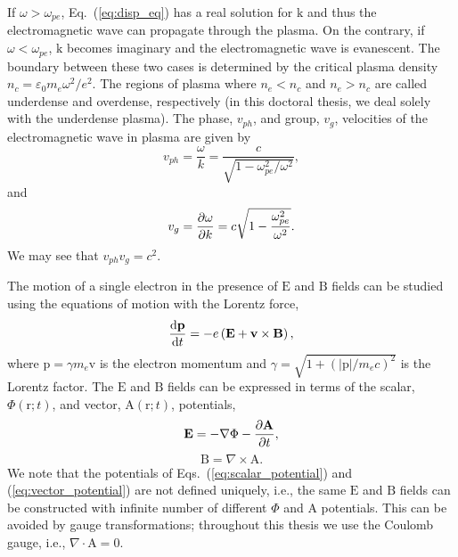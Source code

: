 \documentclass[10pt, a4paper, twoside, openright]{report}
\newcommand{\norm}[1]{|#1|}
\renewcommand{\vec}[1]{\boldsymbol{\mathrm{#1}}}
\newcommand{\rot}[1]{\nabla \times #1}
\newcommand{\grad}[1]{\nabla #1}
\renewcommand{\div}[1]{\nabla \cdot #1}
\begin{document}
If $ \omega > \omega_{pe} $, Eq.~(\ref{eq:disp_eq}) has a real solution for $ \vec{k} $ and thus the electromagnetic wave can propagate through the plasma. On the contrary, if $ \omega < \omega_{pe} $, $ \vec{k} $ becomes imaginary and the electromagnetic wave is evanescent. The boundary between these two cases is determined by the critical plasma density $ n_c = \varepsilon_0 m_e \omega^2 / e^2 $. The regions of plasma where $ n_e < n_c $ and $ n_e > n_c $ are called underdense and overdense, respectively (in this doctoral thesis, we deal solely with the underdense plasma). The phase, $ v_{ph} $, and group, $ v_g $, velocities of the electromagnetic wave in plasma are given by
\begin{equation}\label{eq:phase_velocity}
	v_{ph} = \frac{\omega}{k} = \frac{c}{\sqrt{1 - \omega_{pe}^2 / \omega^2}},
\end{equation}
and
\begin{equation}\label{eq:group_velocity}
	v_g = \diffp{\omega}{k} = c \sqrt{1 - \frac{\omega_{pe}^2}{\omega^2}}.
\end{equation}
We may see that $ v_{ph} v_{g} = c^2 $. 

The motion of a single electron in the presence of $ \vec{E} $ and $ \vec{B} $ fields can be studied using the equations of motion with the Lorentz force,
\begin{equation}\label{eq:lorentz_eq}
	\diff{\vec{p}}{t} = -e \left( \vec{E} + \vec{v} \times \vec{B} \right),
\end{equation}
where $ \vec{p} = \gamma m_e \vec{v} $ is the electron momentum and $ \gamma = \sqrt{1 + \left( \norm{\vec{p}} / m_e c \right)^2 } $ is the Lorentz factor. The $ \vec{E} $ and $ \vec{B} $ fields can be expressed in terms of the scalar, $ \Phi \left( \vec{r}; t \right) $, and vector, $ \vec{A} \left( \vec{r}; t \right) $, potentials,
\begin{equation}\label{eq:scalar_potential}
	\vec{E} = -\grad{\Phi} - \diffp{\vec{A}}{t},
\end{equation}
\begin{equation}\label{eq:vector_potential}
	\vec{B} = \rot{\vec{A}}.
\end{equation}
We note that the potentials of Eqs.~(\ref{eq:scalar_potential}) and (\ref{eq:vector_potential}) are not defined uniquely, i.e., the same $ \vec{E} $ and $ \vec{B} $ fields can be constructed with infinite number of different $ \Phi $ and $ \vec{A} $ potentials. This can be avoided by gauge transformations; throughout this thesis we use the Coulomb gauge, i.e., $ \div{\vec{A}} = 0 $. 
\end{document}
